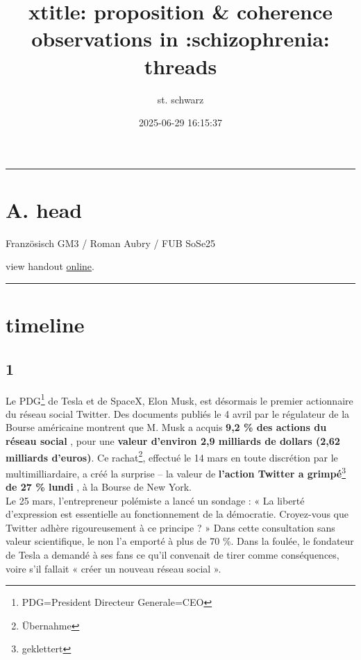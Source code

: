\documentclass[]{tufte-handout}
\title[xtitle]{xtitle: proposition \& coherence observations in
:schizophrenia: threads}
\author{st. schwarz}
\date{2025-06-29 16:15:37}
\begin{document}
\maketitle




\begin{center}\rule{0.5\linewidth}{0.5pt}\end{center}

\section{A. head}\label{a.-head}

Französisch GM3 / Roman Aubry / FUB SoSe25

view handout
\href{https://ada-sub.dh-index.org/school/papers/017/}{online}.

\begin{center}\rule{0.5\linewidth}{0.5pt}\end{center}

\section{timeline}\label{timeline}

\subsection{1}\label{section}

Le PDG\footnote{PDG=President Directeur Generale=CEO} de Tesla et de
SpaceX, Elon Musk, est désormais le premier actionnaire du réseau social
Twitter. Des documents publiés le 4 avril par le régulateur de la Bourse
américaine montrent que M. Musk a acquis \textbf{9,2 \% des actions du
réseau social }, pour une \textbf{valeur d'environ 2,9 milliards de
dollars (2,62 milliards
d'euros)}.\citep{united_states_security_and_exchange_commission_schedule_2022}
Ce rachat\footnote{Übernahme}, effectué le 14 mars en toute discrétion
par le multimilliardaire, a créé la surprise -- la valeur de
\textbf{l'action Twitter a grimpé}\footnote{geklettert} \textbf{de 27 \%
lundi }, à la Bourse de New York.\\
Le 25 mars, l'entrepreneur polémiste a lancé un sondage : « La liberté
d'expression est essentielle au fonctionnement de la démocratie.
Croyez-vous que Twitter adhère rigoureusement à ce principe ? » Dans
cette consultation sans valeur scientifique, le non l'a emporté à plus
de 70 \%. Dans la foulée, le fondateur de Tesla a demandé à ses fans ce
qu'il convenait de tirer comme conséquences, voire s'il fallait « créer
un nouveau réseau social ». \citep[Q:][]{le_monde_elon_2022}
\end{document}
